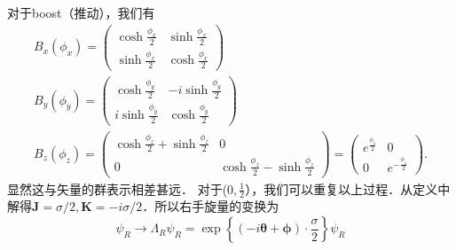 对于boost（推动），我们有
\begin{equation}
\begin{array}{c}
B_{x}\left(\phi_{x}\right)=\left(\begin{array}{cc}
\cosh \frac{\phi_{x}}{2} & \sinh \frac{\phi_{x}}{2} \\
\sinh \frac{\phi_{x}}{2} & \cosh \frac{\phi_{x}}{2}
\end{array}\right) \\
B_{y}\left(\phi_{y}\right)=\left(\begin{array}{cc}
\cosh \frac{\phi_{y}}{2} & -i \sinh \frac{\phi_{y}}{2} \\
i \sinh \frac{\phi_{y}}{2} & \cosh \frac{\phi_{y}}{2}
\end{array}\right) \\
B_{z}\left(\phi_{z}\right)=\left(\begin{array}{cc}
\cosh \frac{\phi_{z}}{2}+\sinh \frac{\phi_{z}}{2} & 0 \\
0 & \cosh \frac{\phi_{z}}{2}-\sinh \frac{\phi_{z}}{2}
\end{array}\right)=\left(\begin{array}{cc}
e^{\frac{\phi_{z}}{2}} & 0 \\
0 & e^{-\frac{\phi_{z}}{2}}
\end{array}\right) .
\end{array}
\end{equation}
显然这与矢量的群表示相差甚远．
对于($0,\frac{1}{2}$），我们可以重复以上过程．从定义中解得$\mathbf{J}=\sigma / 2 ,\mathbf{K}=-i \sigma / 2$．所以右手旋量的变换为
\begin{equation}
\psi_{R} \rightarrow \Lambda_{R} \psi_{R}=\exp \left\{(-i \boldsymbol{\theta}+\boldsymbol{\phi}) \cdot \frac{\sigma}{2}\right\} \psi_{R}
\end{equation}

